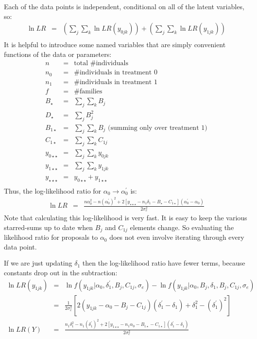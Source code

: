 \documentclass[11pt]{article}
\begin{document}
Each of the data points is independent, conditional on all of the latent variables, so:
\begin{eqnarray*}
\ln LR & = & \left(\sum_j\sum_k \ln LR(y_{0jk})  \right) + \left(\sum_j\sum_k \ln LR(y_{1jk})  \right)\\
\end{eqnarray*}
It is helpful to introduce some named variables that are simply convenient functions of the data or parameters:
\begin{eqnarray*}
n & = & \mbox{total \# individuals} \\
n_0 & = & \mbox{\# individuals in treatment 0} \\
n_1 & = & \mbox{\# individuals in treatment 1} \\
f & = & \mbox{\# families} \\
B_{\star} & = & \sum_j \sum_k B_j \\
D_{\star} & = & \sum_j B_j^2 \\
B_{1\star} & = & \sum_j \sum_k B_j \mbox{ (summing only over treatment 1)}\\
C_{1\star} & = & \sum_j \sum_k C_{1j} \\
y_{0\star\star} & = & \sum_j\sum_k y_{0jk} \\
y_{1\star\star} & = & \sum_j\sum_k y_{1jk} \\
y_{\star\star\star} & = & y_{0\star\star} + y_{1\star\star} \\
\end{eqnarray*}
Thus, the log-likelihood ratio for  $\alpha_0\rightarrow\alpha_0^{\prime}$ is: 
\begin{eqnarray*}
\ln LR & = & \frac{n\alpha_0^2 - n(\alpha_0^{\prime})^2  + 2\left[y_{\star\star\star} - n_1\delta_1  - B_{\star}  - C_{1\star}\right](\alpha_0^\prime - \alpha_0)}{2\sigma_e^2} 
\end{eqnarray*}
Note that calculating this log-likelihood is very fast.
It is easy to keep the various starred-sums up to date when $B_j$ and $C_{1j}$ elements change.
So evaluating the likelihood ratio for proposals to $\alpha_0$ does not even involve iterating through every data point.

If we are just updating $\delta_1$ then the log-likelihood ratio have fewer terms, because constants drop out in the subtraction:
\begin{eqnarray*}
\ln LR(y_{1jk}) & = &  \ln f(y_{1jk}|\alpha_0,\delta_1^{\prime}, B_j,C_{1j},\sigma_e) - \ln f(y_{1jk}|\alpha_0, B_j,\delta_1, B_j,C_{1j},\sigma_e) \\
		& = &  \frac{1}{2\sigma_e^2}  \left[2 \left(y_{1jk} -\alpha_0 - B_j-C_{1j}\right)(\delta_1^\prime - \delta_1) + \delta_1^2- (\delta_1^{\prime})^2\right]\\
\ln LR(Y) & = & \frac{n_1\delta_1^2 - n_1(\delta_1^{\prime})^2  + 2\left[y_{1\star\star} - n_1\alpha_0  - B_{1\star}  - C_{1\star}\right](\delta_1^\prime - \delta_1)}{2\sigma_e^2} 
\end{eqnarray*}
\end{document}
